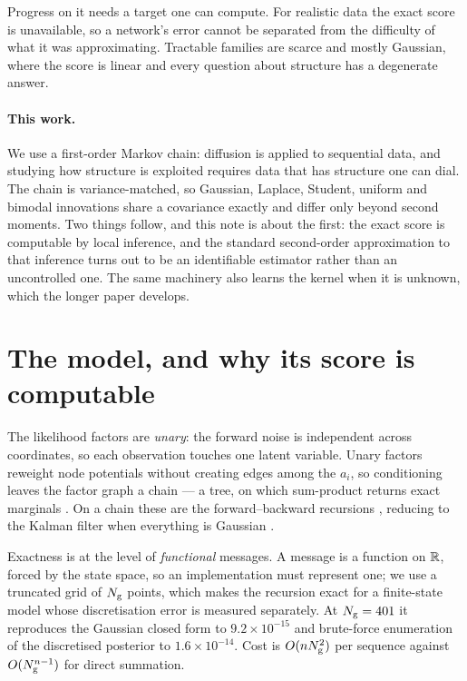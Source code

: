 \documentclass{article}
\begin{document}
Progress on it needs a target one can compute. For realistic data the exact score is unavailable,
so a network's error cannot be separated from the difficulty of what it was approximating.
Tractable families are scarce and mostly Gaussian, where the score is linear and every question
about structure has a degenerate answer.

\paragraph{This work.} We use a first-order Markov chain: diffusion is applied to sequential data,
and studying how structure is exploited requires data that has structure one can dial. The chain
is variance-matched, so Gaussian, Laplace, Student, uniform and bimodal innovations share a
covariance exactly and differ only beyond second moments. Two things follow, and this note is about
the first: the exact score is computable by local inference, and the standard second-order
approximation to that inference turns out to be an identifiable estimator rather than an
uncontrolled one. The same machinery also learns the kernel when it is unknown, which the longer
paper develops.

\section{The model, and why its score is computable}



The likelihood factors are \emph{unary}: the forward noise is independent across coordinates, so
each observation touches one latent variable. Unary factors reweight node potentials without
creating edges among the $a_i$, so conditioning leaves the factor graph a chain --- a tree, on
which sum-product returns exact marginals \citep{pearl1988,kschischang2001,mezard2009}. On a chain
these are the forward--backward recursions \citep{baum1970,rabiner1989}, reducing to the Kalman
filter when everything is Gaussian \citep{kalman1960,rauch1965}.

Exactness is at the level of \emph{functional} messages. A message is a function on $\mathbb{R}$,
forced by the state space, so an implementation must represent one; we use a truncated grid of
$N_{\mathrm{g}}$ points, which makes the recursion exact for a finite-state model whose discretisation
error is measured separately. At $N_{\mathrm{g}}=401$ it reproduces the Gaussian closed form to
$9.2\times10^{-15}$ and brute-force enumeration of the discretised posterior to
$1.6\times10^{-14}$. Cost is $O(nN_{\mathrm{g}}^{2})$ per sequence against $O(N_{\mathrm{g}}^{n-1})$
for direct summation.
\end{document}
